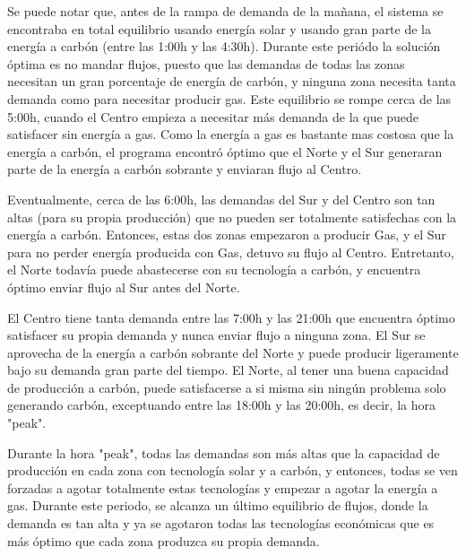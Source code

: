 \documentclass[12pt,twoside]{article}
\begin{document}
	\hspace{1cm} Se puede notar que, antes de la rampa de demanda de la ma\~{n}ana, el sistema se encontraba en total equilibrio usando energ\'ia solar y usando gran parte de la energ\'ia a carb\'on (entre las 1:00h y las 4:30h). Durante este peri\'odo la soluci\'on \'optima es no mandar flujos, puesto que las demandas de todas las zonas necesitan un gran porcentaje de energ\'ia de carb\'on, y ninguna zona necesita tanta demanda como para necesitar producir gas. Este equilibrio se rompe cerca de las 5:00h, cuando el Centro empieza a necesitar m\'as demanda de la que puede satisfacer sin energ\'ia a gas. Como la energ\'ia a gas es bastante mas costosa que la energ\'ia a carb\'on, el programa encontr\'o \'optimo que el Norte y el Sur generaran parte de la energ\'ia a carb\'on sobrante y enviaran flujo al Centro.
	
	\hspace{1cm} Eventualmente, cerca de las 6:00h, las demandas del Sur y del Centro son tan altas (para su propia producci\'on) que no pueden ser totalmente satisfechas con la energ\'ia a carb\'on. Entonces, estas dos zonas empezaron a producir Gas, y el Sur para no perder energ\'ia producida con Gas, detuvo su flujo al Centro. Entretanto, el Norte todav\'ia puede abastecerse con su tecnolog\'ia a carb\'on, y encuentra \'optimo enviar flujo al Sur antes del Norte.
	
	\hspace{1cm} El Centro tiene tanta demanda entre las 7:00h y las 21:00h que encuentra \'optimo satisfacer su propia demanda y nunca enviar flujo a ninguna zona. El Sur se aprovecha de la energ\'ia a carb\'on sobrante del Norte y puede producir ligeramente bajo su demanda gran parte del tiempo. El Norte, al tener una buena capacidad de producci\'on a carb\'on, puede satisfacerse a si misma sin ning\'un problema solo generando carb\'on, exceptuando entre las 18:00h y las 20:00h, es decir, la hora "peak".
	
	\hspace{1cm} Durante la hora "peak", todas las demandas son m\'as altas que la capacidad de producci\'on en cada zona con tecnolog\'ia solar y a carb\'on, y entonces, todas se ven forzadas a agotar totalmente estas tecnolog\'ias y empezar a agotar la energ\'ia a gas. Durante este periodo, se alcanza un \'ultimo equilibrio de flujos, donde la demanda es tan alta y ya se agotaron todas las tecnolog\'ias econ\'omicas que es m\'as \'optimo que cada zona produzca su propia demanda.
	
\end{document}
